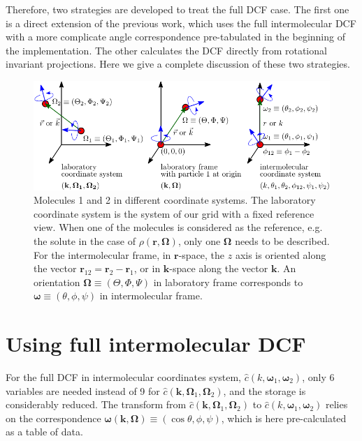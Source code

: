 Therefore, two strategies are developed to treat the full \acs{DCF}
case. The first one is a direct extension of the previous work, which
uses the full intermolecular \acs{DCF} with a more complicate angle
correspondence pre-tabulated in the beginning of the implementation.
The other calculates the \acs{DCF} directly from rotational invariant
projections. Here we give a complete discussion of these two strategies.

\begin{figure}[H]
\begin{centering}
\includegraphics{_figure/coordinate_system}
\par\end{centering}
\caption[Molecules 1 and 2 in different coordinate systems]{Molecules 1 and 2 in different coordinate systems. The laboratory
coordinate system is the system of our grid with a fixed reference
view. When one of the molecules is considered as the reference, e.g.
the solute in the case of $\rho(\mathbf{r},\mathbf{\Omega})$, only
one $\mathbf{\Omega}$ needs to be described. For the intermolecular
frame, in $\mathbf{r}$-space, the $z$ axis is oriented along the
vector $\mathbf{r}_{12}=\mathbf{r}_{2}-\mathbf{r}_{1}$, or in $\mathbf{k}$-space
along the vector $\mathbf{k}$. An orientation $\mathbf{\Omega}\equiv(\Theta,\Phi,\Psi)$
in laboratory frame corresponds to $\boldsymbol{\omega}\equiv(\theta,\phi,\psi)$
in intermolecular frame.\label{fig:coordinate_systems}}
\end{figure}


\section{Using full intermolecular DCF}

For the full \acs{DCF} in intermolecular coordinates system, $\hat{c}(k,\boldsymbol{\omega}_{1},\boldsymbol{\omega}_{2})$,
only 6 variables are needed instead of 9 for $\hat{c}(\mathbf{k},\mathbf{\Omega}_{1},\mathbf{\Omega}_{2})$,
and the storage is considerably reduced. The transform from $\hat{c}(\mathbf{k},\mathbf{\Omega}_{1},\mathbf{\Omega}_{2})$
to $\hat{c}(k,\boldsymbol{\omega}_{1},\boldsymbol{\omega}_{2})$ relies
on the correspondence $\boldsymbol{\omega}(\mathbf{k},\mathbf{\Omega})\equiv(\cos\theta,\phi,\psi)$,
which is here pre-calculated as a table of data.

